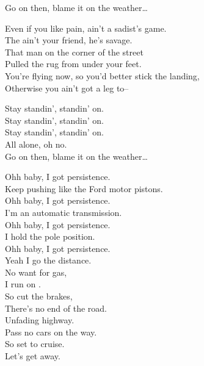 Go on then, blame it on the weather… \\


Even if you like pain,  ain't a sadist's game. \\
The  ain't your friend, he's savage. \\
That man on the corner of the street \\
Pulled the rug from under your feet. \\
You're flying now, so you'd better stick the landing, \\
Otherwise you ain't got a leg to-- \\


Stay standin', standin' on. \\
Stay standin', standin' on. \\
Stay standin', standin' on. \\
All alone, oh no. \\

Go on then, blame it on the weather… \\





Ohh baby, I got persistence. \\
Keep pushing like the Ford motor pistons. \\
Ohh baby, I got persistence. \\
I'm an automatic transmission. \\
Ohh baby, I got persistence. \\
I hold the pole position. \\
Ohh baby, I got persistence. \\
Yeah I go the distance. \\

No want for gas, \\
I run on . \\
So cut the brakes, \\
There's no end of the road. \\
Unfading highway. \\
Pass no cars on the way. \\
So set to cruise. \\
Let's get away. \\

